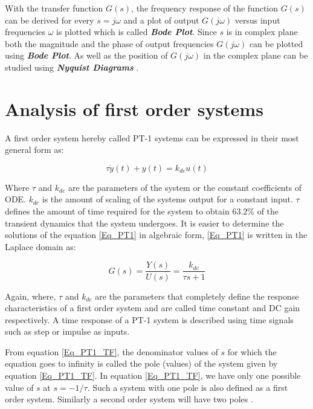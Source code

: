 With the transfer function $G(s)$, the frequency response of the function $G(s)$ can be derived for every $s = j \omega$ and a plot of output $G(j\omega)$ versus input frequencies $\omega$ is plotted which is called \textbf{\textit{Bode Plot}}. Since $s$ is in complex plane both the magnitude and the phase of output frequencies $G(j\omega)$ can be plotted using \textbf{\textit{Bode Plot}}. As well as the position of $G(j\omega)$ in the complex plane can be studied using \textbf{\textit{Nyquist Diagrams}} \cite{CTMS2019_Analysis}.

\section{Analysis of first order systems}

A first order system hereby called PT-1 systems can be expressed in their most general form as:

\begin{equation} \label{Eq_PT1}
	\tau \dot{y}(t) + y(t) = k_{dc} u (t)
\end{equation}

Where $\tau$ and $k_{dc}$ are the parameters of the system or the constant coefficients of ODE. $k_{dc}$ is the amount of scaling of the systems output for a constant input. $\tau$ defines the amount of time required for the system to obtain $63.2 \%$ of the transient dynamics that the system undergoes. It is easier to determine the solutions of the equation \eqref{Eq_PT1} in algebraic form, \eqref{Eq_PT1} is written in the Laplace domain as:

\begin{equation} \label{Eq_PT1_TF}
	G(s) = \frac{Y(s)}{U(s)} = \frac{k_{dc}}{\tau s + 1}
\end{equation}

Again, where, $\tau$ and $k_{dc}$ are the parameters that completely define the response characteristics of a first order system and are called time constant and DC gain respectively. A time response of a PT-1 system is described using time signals such as step or impulse as inputs.

From equation \eqref{Eq_PT1_TF}, the denominator values of $s$ for which the equation goes to infinity is called the pole (values) of the system given by equation \eqref{Eq_PT1_TF}. In equation \eqref{Eq_PT1_TF}, we have only one possible value of $s$ at $s = -1/\tau$. Such a system with one pole is also defined as a first order system. Similarly a second order system will have two poles \cite[t.2.05]{RickHill_11}.

